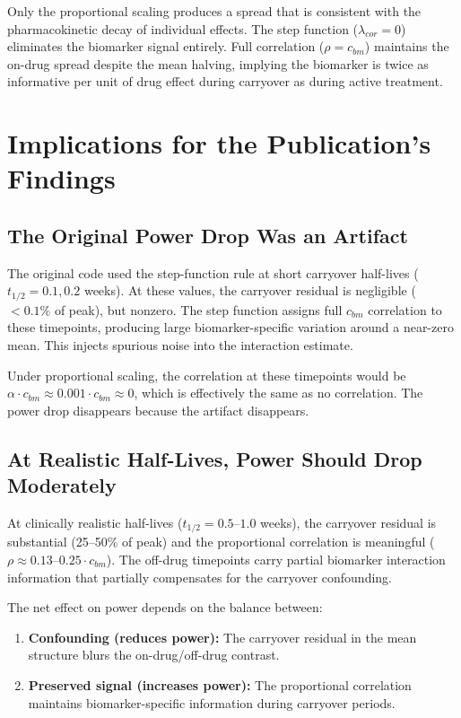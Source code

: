 \documentclass[11pt]{article}
\begin{document}
Only the proportional scaling produces a spread that is
consistent with the pharmacokinetic decay of individual
effects. The step function ($\lambda_{cor} = 0$) eliminates
the biomarker signal entirely. Full correlation
($\rho = c_{bm}$) maintains the on-drug spread despite the
mean halving, implying the biomarker is twice as informative
per unit of drug effect during carryover as during active
treatment.

\section{Implications for the Publication's Findings}

\subsection{The Original Power Drop Was an Artifact}

The original code used the step-function rule at short
carryover half-lives ($t_{1/2} = 0.1, 0.2$ weeks). At these
values, the carryover residual is negligible ($< 0.1\%$ of
peak), but nonzero. The step function assigns full $c_{bm}$
correlation to these timepoints, producing large
biomarker-specific variation around a near-zero mean. This
injects spurious noise into the interaction estimate.

Under proportional scaling, the correlation at these
timepoints would be $\alpha \cdot c_{bm} \approx 0.001
\cdot c_{bm} \approx 0$, which is effectively the same as
no correlation. The power drop disappears because the
artifact disappears.

\subsection{At Realistic Half-Lives, Power Should Drop
            Moderately}

At clinically realistic half-lives ($t_{1/2} = 0.5$--$1.0$
weeks), the carryover residual is substantial (25--50\% of
peak) and the proportional correlation is meaningful
($\rho \approx 0.13$--$0.25 \cdot c_{bm}$). The off-drug
timepoints carry partial biomarker interaction information
that partially compensates for the carryover confounding.

The net effect on power depends on the balance between:

\begin{enumerate}
\item \textbf{Confounding (reduces power):} The carryover
  residual in the mean structure blurs the on-drug/off-drug
  contrast.
\item \textbf{Preserved signal (increases power):} The
  proportional correlation maintains biomarker-specific
  information during carryover periods.
\end{enumerate}
\end{document}
